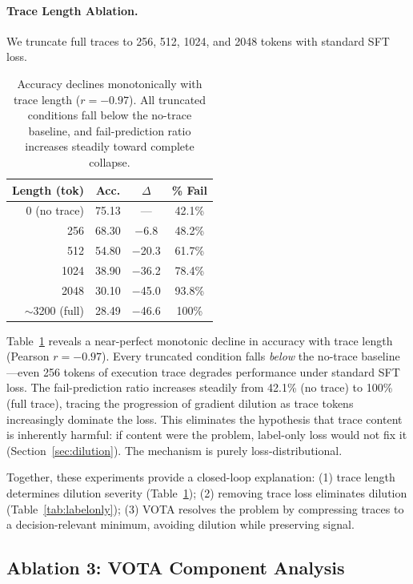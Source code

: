\documentclass[11pt,a4paper]{article}
\begin{document}
\paragraph{Trace Length Ablation.} We truncate full traces to 256, 512, 1024, and 2048 tokens with standard SFT loss.

\begin{table}[t]
\centering
\small
\begin{tabular}{rccc}
\toprule
\textbf{Length (tok)} & \textbf{Acc.} & \textbf{$\Delta$} & \textbf{\% Fail} \\
\midrule
0 (no trace) & 75.13 & --- & 42.1\% \\
256 & 68.30 & $-$6.8 & 48.2\% \\
512 & 54.80 & $-$20.3 & 61.7\% \\
1024 & 38.90 & $-$36.2 & 78.4\% \\
2048 & 30.10 & $-$45.0 & 93.8\% \\
${\sim}$3200 (full) & 28.49 & $-$46.6 & 100\% \\
\bottomrule
\end{tabular}
\caption{Accuracy declines monotonically with trace length ($r = -0.97$). All truncated conditions fall below the no-trace baseline, and fail-prediction ratio increases steadily toward complete collapse.}
\label{tab:length}
\end{table}

Table~\ref{tab:length} reveals a near-perfect monotonic decline in accuracy with trace length (Pearson $r = -0.97$). Every truncated condition falls \emph{below} the no-trace baseline---even 256 tokens of execution trace degrades performance under standard SFT loss. The fail-prediction ratio increases steadily from 42.1\% (no trace) to 100\% (full trace), tracing the progression of gradient dilution as trace tokens increasingly dominate the loss. This eliminates the hypothesis that trace content is inherently harmful: if content were the problem, label-only loss would not fix it (Section~\ref{sec:dilution}). The mechanism is purely loss-distributional.

Together, these experiments provide a closed-loop explanation: (1) trace length determines dilution severity (Table~\ref{tab:length}); (2) removing trace loss eliminates dilution (Table~\ref{tab:labelonly}); (3) VOTA resolves the problem by compressing traces to a decision-relevant minimum, avoiding dilution while preserving signal.

\subsection{Ablation 3: VOTA Component Analysis}
\end{document}
